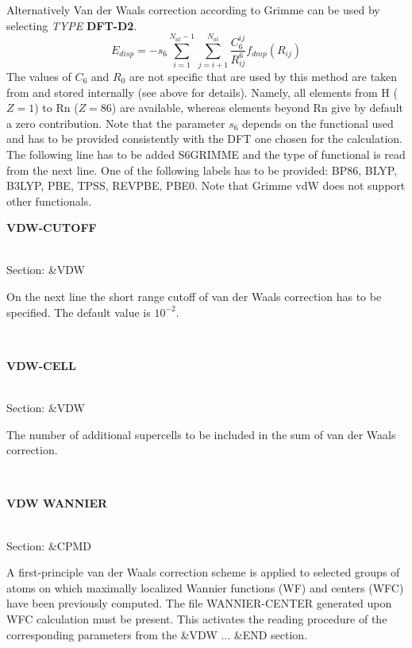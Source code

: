 \documentclass[twoside,10pt,titlepage,a4paper]{article}
\newcommand{\reflabel}[1]{\hypertarget{#1}}
\newcommand{\reflabel}[1]{\label{#1}}
\newcommand{\keyword}[5]{%
\vspace{1.0cm}
\begin{minipage}{15cm}
\reflabel{#1}{\textbf{\large #1}}%
\index{#1}%
\ \textbf{#2}%
\ \textbf{#3}%
\ \textit{#4}%
     \hfill\\\smallskip
     {Section: #5}
     \hfill\\\smallskip\vskip 10pt
\end{minipage}
}%
\newcommand{\desc}[1]{%
   \hspace*{\fill} \parbox{130mm}{\sloppy
                          {#1}%
                             }
     \hfill\\\smallskip
   }%
\newcommand{\desc}[1]{#1\vspace{1ex}}
\begin{document}
{Alternatively Van der Waals correction according to Grimme can be used \cite{Grimme06}
by selecting {\itshape TYPE} {\bf DFT-D2}. 
 \begin{equation}
  E_{disp} = - s_6 \sum_{i=1}^{N_{at} -1} \sum_{j=i+1}^{N_{at}} 
               \frac{C_6^{ij}}{R_{ij}^6} f_{dmp} (R_{ij})
 \end{equation}       
The values of $C_6$ and $R_0$ are not specific that are used by this method are taken 
from \cite{Grimme06} 
and stored internally (see above for details). Namely, all elements from H ($Z=1$) to
Rn ($Z=86$) are available, whereas elements beyond Rn give by default a zero contribution.
Note that the parameter $s_6$ depends on the functional used and has to be provided consistently
with the DFT one chosen for the calculation. The following line has to be added {S6GRIMME}
and the type of functional is read from the next line. One of the following labels has to be provided:
{BP86, BLYP, B3LYP, PBE, TPSS, REVPBE, PBE0}. Note that Grimme vdW does not support other functionals.
}


\keyword{VDW-CUTOFF}{}{}{}{\&VDW}
   \desc{On the next line the short range cutoff of van der Waals correction
    has to be specified. The default value is $10^{-2}$.}

\keyword{VDW-CELL}{}{}{}{\&VDW}
   \desc{The number of additional supercells to be included in the sum of
    van der Waals correction.}

\keyword{VDW WANNIER}{}{}{}{\&CPMD}
\desc{A first-principle van der Waals correction scheme \cite{psil1,psil2,psil3}
  is applied to selected groups of atoms on which maximally localized Wannier
  functions (WF) and centers (WFC) have been previously computed.
  The file WANNIER-CENTER generated upon WFC calculation must be present.
  This activates the reading procedure of the corresponding parameters from
  the \&VDW ... \&END section.}
\end{document}
